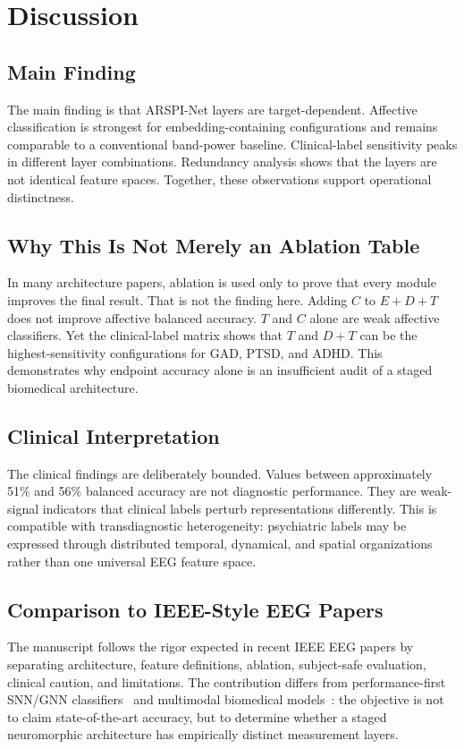 \documentclass[journal]{IEEEtran}
\begin{document}
\section{Discussion}
\subsection{Main Finding}
The main finding is that ARSPI-Net layers are target-dependent. Affective classification is strongest for embedding-containing configurations and remains comparable to a conventional band-power baseline. Clinical-label sensitivity peaks in different layer combinations. Redundancy analysis shows that the layers are not identical feature spaces. Together, these observations support operational distinctness.

\subsection{Why This Is Not Merely an Ablation Table}
In many architecture papers, ablation is used only to prove that every module improves the final result. That is not the finding here. Adding $C$ to $E+D+T$ does not improve affective balanced accuracy. $T$ and $C$ alone are weak affective classifiers. Yet the clinical-label matrix shows that $T$ and $D+T$ can be the highest-sensitivity configurations for GAD, PTSD, and ADHD. This demonstrates why endpoint accuracy alone is an insufficient audit of a staged biomedical architecture.

\subsection{Clinical Interpretation}
The clinical findings are deliberately bounded. Values between approximately 51\% and 56\% balanced accuracy are not diagnostic performance. They are weak-signal indicators that clinical labels perturb representations differently. This is compatible with transdiagnostic heterogeneity: psychiatric labels may be expressed through distributed temporal, dynamical, and spatial organizations rather than one universal EEG feature space.

\subsection{Comparison to IEEE-Style EEG Papers}
The manuscript follows the rigor expected in recent IEEE EEG papers by separating architecture, feature definitions, ablation, subject-safe evaluation, clinical caution, and limitations. The contribution differs from performance-first SNN/GNN classifiers~\cite{gong2023sglnet,klepl2023ad} and multimodal biomedical models~\cite{guo2025mma}: the objective is not to claim state-of-the-art accuracy, but to determine whether a staged neuromorphic architecture has empirically distinct measurement layers.
\end{document}
